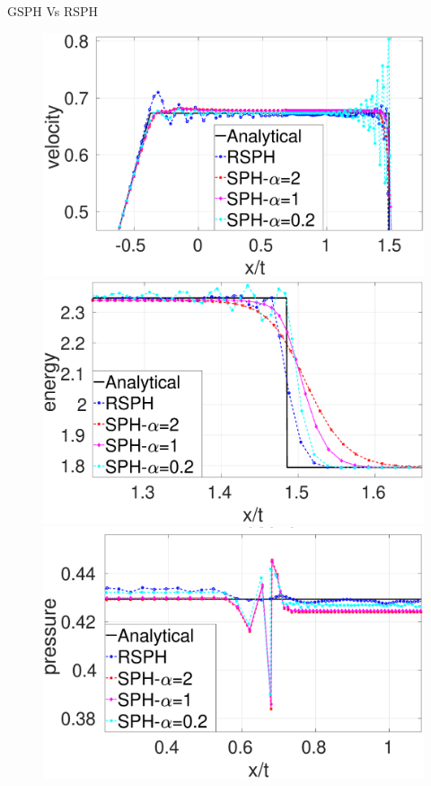 \documentclass{beamer}
\begin{document}
\begin{frame}{GSPH Vs RSPH}
\begin{figure}[t]
    \centering
    \begin{minipage}{.33 \textwidth}
        \centering
        \includegraphics[width=0.99 \textwidth]{./Chapter-4/Figures/Sod/RCM-Sod-SPH-alf-v-zoom}
    \end{minipage}%
    \begin{minipage}{.33 \textwidth}
        \centering
        \includegraphics[width=0.99 \textwidth]{./Chapter-4/Figures/Sod/RCM-Sod-SPH-alf-e-zoom}
    \end{minipage}%
    \begin{minipage}{.33\textwidth}
        \centering
        \includegraphics[width=0.99 \textwidth]{./Chapter-4/Figures/Sod/RCM-Sod-SPH-alf-p-zoom}

\end{minipage}
\end{figure}
\end{frame}
\end{document}
